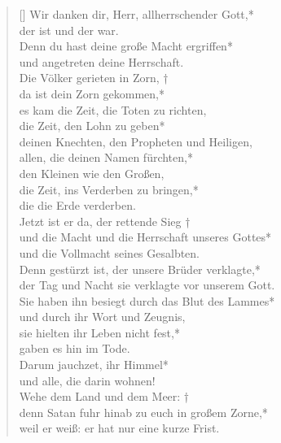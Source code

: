 \begin{verse}[\versewidth]
 Wir danken dir, Herr, allherrschender Gott,*\\
der ist und der war.\\ 
\vin Denn du hast deine große Macht ergriffen*\\
\vin und angetreten deine Herrschaft.\\
Die Völker gerieten in Zorn, †\\
da ist dein Zorn gekommen,*\\
es kam die Zeit, die Toten zu richten,\\
\vin die Zeit, den Lohn zu geben*\\
\vin deinen Knechten, den Propheten und Heiligen,\\
allen, die deinen Namen fürchten,*\\
den Kleinen wie den Großen,\\
\vin die Zeit, ins Verderben zu bringen,*\\
\vin die die Erde verderben.\\

Jetzt ist er da, der rettende Sieg †\\
und die Macht und die Herrschaft unseres Gottes*\\
und die Vollmacht seines Gesalbten.\\
\vin Denn gestürzt ist, der unsere Brüder verklagte,*\\
\vin der Tag und Nacht sie verklagte vor unserem Gott.\\
Sie haben ihn besiegt durch das Blut des Lammes*\\
und durch ihr Wort und Zeugnis,\\ 
\vin sie hielten ihr Leben nicht fest,*\\
\vin gaben es hin im Tode.\\
Darum jauchzet, ihr Himmel*\\
und alle, die darin wohnen!\\
\vin Wehe dem Land und dem Meer: †\\
\vin denn Satan fuhr hinab zu euch in großem Zorne,*\\
\vin weil er weiß: er hat nur eine kurze Frist.\\

\end{verse}


\vspace{0.6cm}


